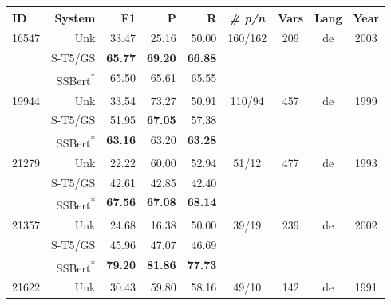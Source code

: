 \documentclass[11pt]{article}
\begin{document}
\begin{table*}[]
    \centering
    \begin{tabular}{l|r|r|r|r|c|c|c|c}
     ID &  System &    F1 &     P &     R &  \textit{\# p/n} & Vars & Lang & Year \\
    \hline
    \hline
    \multirow{3}{3em}{16547} &    Unk & 33.47 & 25.16 & 50.00 &      \multirow{3}{4em}{160/162} &    \multirow{3}{1em}{209} &        \multirow{3}{1em}{de} &         \multirow{3}{2em}{2003} \\
     &    S-T5/GS & \textbf{65.77} & \textbf{69.20} & \textbf{66.88} &       &     &         &             \\
     &    SSBert\textsuperscript{*} & 65.50 & 65.61 & 65.55 &       &     &                   &   \\
    \hline
    \multirow{3}{3em}{19944} &    Unk & 33.54 & 73.27 & 50.91 &      \multirow{3}{4em}{110/94} &    \multirow{3}{1em}{457} &        \multirow{3}{1em}{de} &            \multirow{3}{2em}{1999} \\
     &    S-T5/GS & 51.95 & \textbf{67.05} & 57.38 &       &     &         &             \\
     &    SSBert\textsuperscript{*} & \textbf{63.16} & 63.20 & \textbf{63.28} &       &     &         &             \\
    \hline
    \multirow{3}{3em}{21279} &    Unk & 22.22 & 60.00 & 52.94 &       \multirow{3}{4em}{51/12} &    \multirow{3}{1em}{477} &        \multirow{3}{1em}{de} &            \multirow{3}{2em}{1993} \\
     &    S-T5/GS & 42.61 & 42.85 & 42.40 &        &     &         &             \\
     &    SSBert\textsuperscript{*} & \textbf{67.56} & \textbf{67.08} & \textbf{68.14} &        &     &         &            \\
    \hline
    \multirow{3}{3em}{21357} &    Unk & 24.68 & 16.38 & 50.00 &       \multirow{3}{4em}{39/19} &    \multirow{3}{1em}{239} &        \multirow{3}{1em}{de} &           \multirow{3}{2em}{2002} \\
     &    S-T5/GS & 45.96 & 47.07 & 46.69 &        &     &         &             \\
     &    SSBert\textsuperscript{*} & \textbf{79.20} & \textbf{81.86} & \textbf{77.73} &        &     &         &             \\
    \hline
    \multirow{3}{3em}{21622} &    Unk & 30.43 & 59.80 & 58.16 &       \multirow{3}{4em}{49/10} &    \multirow{3}{1em}{142} &        \multirow{3}{1em}{de} &            \multirow{3}{2em}{1991} \\

\end{tabular}
\end{table*}
\end{document}
